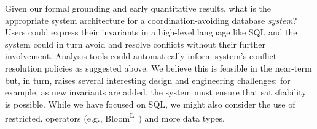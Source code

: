  Given our formal grounding and early
quantitative results, what is the appropriate system architecture for
a coordination-avoiding database \textit{system}? Users could express
their invariants in a high-level language like SQL and the system
could in turn avoid and resolve conflicts without their further
involvement. Analysis tools could automatically inform system's
conflict resolution policies as suggested above. We believe this is
feasible in the near-term but, in turn, raises several interesting
design and engineering challenges: for example, as new invariants are
added, the system must ensure that satisfiability is possible. While
we have focused on SQL, we might also consider the use of restricted,
\iconfluent operators (e.g., Bloom\textsuperscript{L}~\cite{blooml})
and more data types.

